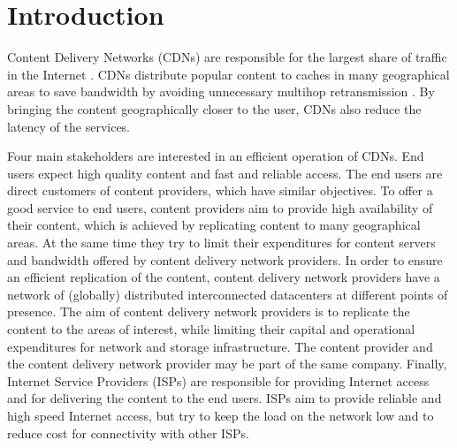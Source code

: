 \chapter{Introduction}\label{chap:introduction}

Content Delivery Networks (CDNs) are responsible for the largest share of traffic in the Internet \cite{cisco2016}.
CDNs distribute popular content to caches in many geographical areas to save bandwidth by avoiding unnecessary multihop retransmission \cite{paschos2016wireless}.
By bringing the content geographically closer to the user, CDNs also reduce the latency of the services.

Four main stakeholders are interested in an efficient operation of CDNs.
End users expect high quality content and fast and reliable access.
The end users are direct customers of content providers, which have similar objectives.
To offer a good service to end users, content providers aim to provide high availability of their content, which is achieved by replicating content to many geographical areas.
At the same time they try to limit their expenditures for content servers and bandwidth offered by content delivery network providers.
In order to ensure an efficient replication of the content, content delivery network providers have a network of (globally) distributed interconnected datacenters at different points of presence.
The aim of content delivery network providers is to replicate the content to the areas of interest, while limiting their capital and operational expenditures for network and storage infrastructure.
The content provider and the content delivery network provider may be part of the same company.
Finally, Internet Service Providers (ISPs) are responsible for providing Internet access and for delivering the content to the end users.
ISPs aim to provide reliable and high speed Internet access, but try to keep the load on the network low and to reduce cost for connectivity with other ISPs.


